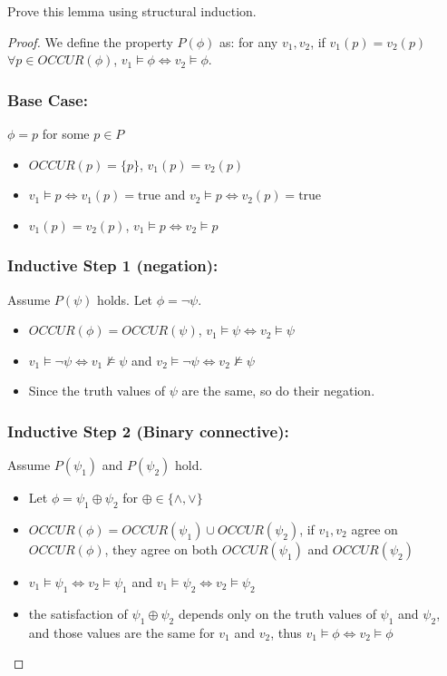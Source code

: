 \documentclass{article}
\begin{document}
Prove this lemma using structural induction.
\begin{proof}
We define the property $P(\phi)$ as: for any $v_1, v_2$, if $v_1(p) = v_2(p)$ $\forall p \in OCCUR(\phi)$, $v_1 \models \phi \iff v_2 \models \phi$. 
\subsubsection*{Base Case:} $\phi = p$ for some $p \in P$
\begin{itemize}
    \item $OCCUR(p) = \{p\}$,  $v_1(p) = v_2(p)$
    \item $v_1 \models p \iff v_1(p) = \text{true}$ and $v_2 \models p \iff v_2(p) = \text{true}$
    \item $v_1(p) = v_2(p)$, $v_1 \models p \iff v_2 \models p$
\end{itemize}

\subsubsection*{Inductive Step 1 (negation):} Assume $P(\psi)$ holds. Let $\phi = \neg \psi$.
\begin{itemize}
    \item $OCCUR(\phi) = OCCUR(\psi)$, $v_1 \models \psi \iff v_2 \models \psi$
    \item $v_1 \models \neg \psi \iff v_1 \not\models \psi$ and $v_2 \models \neg \psi \iff v_2 \not\models \psi$
    \item Since the truth values of $\psi$ are the same, so do their negation. 
\end{itemize}
\subsubsection*{Inductive Step 2 (Binary connective):} Assume $P(\psi_1)$ and $P(\psi_2)$ hold. 
\begin{itemize}
    \item Let $\phi = \psi_1 \oplus \psi_2$ for $\oplus \in \{\land, \lor\}$
    \item $OCCUR(\phi) = OCCUR(\psi_1) \cup OCCUR(\psi_2)$, if $v_1, v_2$ agree on $OCCUR(\phi)$, they agree on both $OCCUR(\psi_1)$ and $OCCUR(\psi_2)$
    \item  $v_1 \models \psi_1 \iff v_2 \models \psi_1$ and $v_1 \models \psi_2 \iff v_2 \models \psi_2$
    \item the satisfaction of $\psi_1 \oplus \psi_2$ depends only on the truth values of $\psi_1$ and $\psi_2$, and those values are the same for $v_1$ and $v_2$, thus $v_1 \models \phi \iff v_2 \models \phi$
\end{itemize}

\end{proof}
\end{document}
